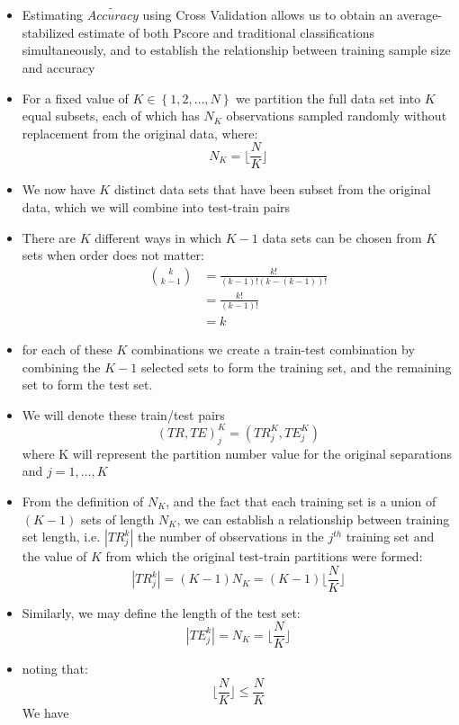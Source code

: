 \documentclass[12pt,]{article}
\providecommand{\tightlist}{%
  \setlength{\itemsep}{0pt}\setlength{\parskip}{0pt}}
\begin{document}
\begin{itemize}
\tightlist
\item
  Estimating \(\tilde{Accuracy}\) using Cross Validation allows us to
  obtain an average-stabilized estimate of both Pscore and traditional
  classifications simultaneously, and to establish the relationship
  between training sample size and accuracy
\item
  For a fixed value of \(K \in \left \{ 1, 2, \ldots, N \right \}\) we
  partition the full data set into \(K\) equal subsets, each of which
  has \(N_{K}\) observations sampled randomly without replacement from
  the original data, where:
  \[N_{K}=\Big \lfloor \frac{N}{K} \Big \rfloor\]
\item
  We now have \(K\) distinct data sets that have been subset from the
  original data, which we will combine into test-train pairs
\item
  There are \(K\) different ways in which \(K-1\) data sets can be
  chosen from \(K\) sets when order does not matter: \begin{align*}
  \binom{k}{k-1} &= \frac{k!}{(k-1)!(k-(k-1))!}\\[0.5em]
  &= \frac{k!}{(k-1)!}\\[0.5em]
  &= k
  \end{align*}
\item
  for each of these \(K\) combinations we create a train-test
  combination by combining the \(K-1\) selected sets to form the
  training set, and the remaining set to form the test set.
\item
  We will denote these train/test pairs
  \[\left(TR, TE \right)^{K}_{j}=\left(TR_{j}^{K}, TE_{j}^{K} \right) \]
  where K will represent the partition number value for the original
  separations and \(j=1, \ldots, K\)
\item
  From the definition of \(N_{K}\), and the fact that each training set
  is a union of \(\left(K-1 \right)\) sets of length \(N_{K}\), we can
  establish a relationship between training set length, i.e.
  \(|TR_{j}^{k}|\) the number of observations in the \(j^{th}\) training
  set and the value of \(K\) from which the original test-train
  partitions were formed:\\
  \[|TR_{j}^{k}|=(K-1)N_{K}=(K-1)\Big \lfloor \frac{N}{K} \Big \rfloor\]
\item
  Similarly, we may define the length of the test set:
  \[|TE_{j}^{k}|=N_{K}=\Big \lfloor \frac{N}{K} \Big \rfloor\]
\item
  noting that:
  \[\Big \lfloor \frac{N}{K} \Big \rfloor \leq \frac{N}{K}\] We have

\end{itemize}
\end{document}
